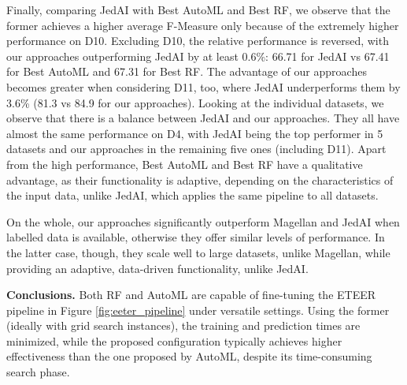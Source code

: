 {

Finally, comparing JedAI with Best AutoML and Best RF, we observe that the former achieves a higher average F-Measure only because of the extremely higher performance on D10. Excluding D10, the relative performance is reversed, with our approaches outperforming JedAI by at least 0.6\%: 66.71 for JedAI vs 67.41 for Best AutoML and 67.31 for Best RF. The advantage of our approaches becomes greater when considering D11, too, where JedAI underperforms them by 3.6\% (81.3 vs 84.9 for our approaches). Looking at the individual datasets, we observe that there is a balance between JedAI and our approaches. They all have almost the same performance on D4, with JedAI being the top performer in 5 datasets and our approaches in the remaining five ones (including D11). Apart from the high performance, Best AutoML and Best RF have a qualitative advantage, as their functionality is adaptive, depending on the characteristics of the input data, unlike JedAI, which applies the same pipeline to all datasets.

On the whole, our approaches significantly outperform Magellan and JedAI when labelled data is available, otherwise they offer similar levels of performance. In the latter case, though, they scale well to large datasets, unlike Magellan, while providing an adaptive, data-driven functionality, unlike JedAI.
}

\textbf{Conclusions.} Both RF and AutoML 
are capable of fine-tuning the ETEER pipeline in Figure \ref{fig:eeter_pipeline} under versatile settings. Using the former (ideally with grid search instances), the training and prediction times are minimized, while the proposed configuration typically achieves higher effectiveness than the one proposed by AutoML, despite its time-consuming search phase. 

